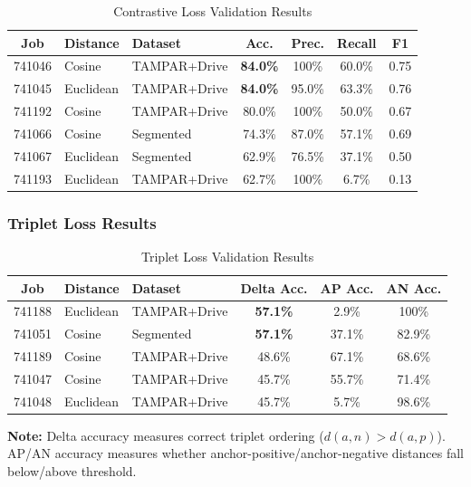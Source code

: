 \documentclass[12pt,a4paper]{article}
\begin{document}
\begin{table}[H]
\centering
\caption{Contrastive Loss Validation Results}
\label{tab:contrastive_results}
\begin{tabular}{cllcccc}
\toprule
\textbf{Job} & \textbf{Distance} & \textbf{Dataset} & \textbf{Acc.} & \textbf{Prec.} & \textbf{Recall} & \textbf{F1} \\
\midrule
741046 & Cosine & TAMPAR+Drive & \textbf{84.0\%} & 100\% & 60.0\% & 0.75 \\
741045 & Euclidean & TAMPAR+Drive & \textbf{84.0\%} & 95.0\% & 63.3\% & 0.76 \\
741192 & Cosine & TAMPAR+Drive & 80.0\% & 100\% & 50.0\% & 0.67 \\
741066 & Cosine & Segmented & 74.3\% & 87.0\% & 57.1\% & 0.69 \\
741067 & Euclidean & Segmented & 62.9\% & 76.5\% & 37.1\% & 0.50 \\
741193 & Euclidean & TAMPAR+Drive & 62.7\% & 100\% & 6.7\% & 0.13 \\
\bottomrule
\end{tabular}
\end{table}

\subsubsection{Triplet Loss Results}

\begin{table}[H]
\centering
\caption{Triplet Loss Validation Results}
\label{tab:triplet_results}
\begin{tabular}{cllccc}
\toprule
\textbf{Job} & \textbf{Distance} & \textbf{Dataset} & \textbf{Delta Acc.} & \textbf{AP Acc.} & \textbf{AN Acc.} \\
\midrule
741188 & Euclidean & TAMPAR+Drive & \textbf{57.1\%} & 2.9\% & 100\% \\
741051 & Cosine & Segmented & \textbf{57.1\%} & 37.1\% & 82.9\% \\
741189 & Cosine & TAMPAR+Drive & 48.6\% & 67.1\% & 68.6\% \\
741047 & Cosine & TAMPAR+Drive & 45.7\% & 55.7\% & 71.4\% \\
741048 & Euclidean & TAMPAR+Drive & 45.7\% & 5.7\% & 98.6\% \\
\bottomrule
\end{tabular}
\end{table}

\textbf{Note:} Delta accuracy measures correct triplet ordering ($d(a,n) > d(a,p)$). AP/AN accuracy measures whether anchor-positive/anchor-negative distances fall below/above threshold.
\end{document}
